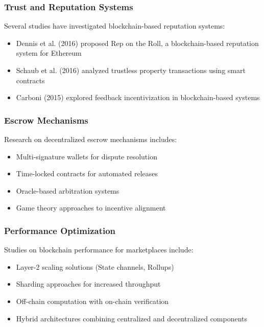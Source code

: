 \documentclass[a4paper,13pt,twoside]{report}
\theoremstyle{definition}
\begin{document}
\subsubsection{Trust and Reputation Systems}

Several studies have investigated blockchain-based reputation systems:

\begin{itemize}
    \item Dennis et al. (2016) proposed Rep on the Roll, a blockchain-based reputation system for Ethereum
    \item Schaub et al. (2016) analyzed trustless property transactions using smart contracts
    \item Carboni (2015) explored feedback incentivization in blockchain-based systems
\end{itemize}

\subsubsection{Escrow Mechanisms}

Research on decentralized escrow mechanisms includes:

\begin{itemize}
    \item Multi-signature wallets for dispute resolution
    \item Time-locked contracts for automated releases
    \item Oracle-based arbitration systems
    \item Game theory approaches to incentive alignment
\end{itemize}

\subsubsection{Performance Optimization}

Studies on blockchain performance for marketplaces include:

\begin{itemize}
    \item Layer-2 scaling solutions (State channels, Rollups)
    \item Sharding approaches for increased throughput
    \item Off-chain computation with on-chain verification
    \item Hybrid architectures combining centralized and decentralized components
\end{itemize}
\end{document}
